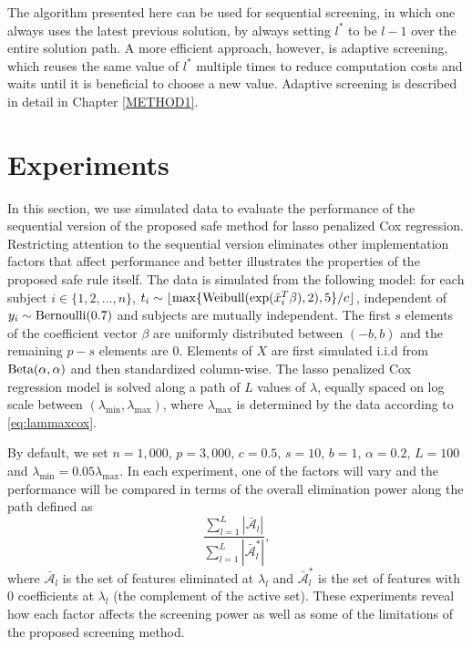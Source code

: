 The algorithm presented here can be used for sequential screening, in which one always uses the latest previous solution, by always setting $l^*$ to be $l-1$ over the entire solution path. A more efficient approach, however, is adaptive screening, which reuses the same value of $l^*$ multiple times to reduce computation costs and waits until it is beneficial to choose a new value. Adaptive screening is described in detail in Chapter \ref{METHOD1}.

\section{Experiments}

In this section, we use simulated data to evaluate the performance of the sequential version of the proposed safe method for lasso penalized Cox regression. Restricting attention to the sequential version eliminates other implementation factors that affect performance and better illustrates the properties of the proposed safe rule itself. The data is simulated from the following model: for each subject $i\in\{1,2,...,n\}$, $t_i \sim \lfloor\max\{\textnormal{Weibull}(\exp(\tilde{x}_i^T \beta),2), 5\}/c\rfloor $, independent of $y_i \sim \textnormal{Bernoulli}(0.7)$ and subjects are mutually independent. The first $s$ elements of the coefficient vector $\beta$ are uniformly distributed between $(-b,b)$ and the remaining $p-s$ elements are $0$. Elements of $X$ are first simulated i.i.d from $\textnormal{Beta}(\alpha,\alpha)$ and then standardized column-wise. The lasso penalized Cox regression model is solved along a path of $L$ values of $\lambda$, equally spaced on log scale between $(\lambda_{\min},\lambda_{\max})$, where $\lambda_{\max}$ is determined by the data according to \eqref{eq:lammaxcox}. 

By default, we set $n=1,000$, $p=3,000$, $c=0.5$, $s=10$, $b=1$, $\alpha=0.2$, $L=100$ and $\lambda_{\min}=0.05\lambda_{\max}$. In each experiment, one of the factors will vary and the performance will be compared in terms of the overall elimination power along the path defined as
\begin{equation}
    \frac{\sum_{l=1}^L|\bar{\mathcal{A}}_l|}{\sum_{l=1}^L|\bar{\mathcal{A}}^*_l|},
\end{equation}
where $\bar{\mathcal{A}}_l$ is the set of features eliminated at $\lambda_l$ and $\bar{\mathcal{A}}^*_l$ is the set of features with 0 coefficients at $\lambda_l$ (the complement of the active set). These experiments reveal how each factor affects the screening power as well as some of the limitations of the proposed screening method.

